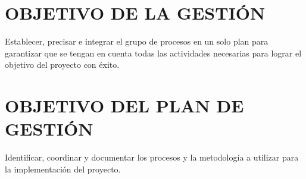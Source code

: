 \chapter{OBJETIVO DE LA GESTI\'ON}

Establecer, precisar e integrar el grupo de procesos en un solo plan para 
garantizar que se tengan en cuenta todas las actividades necesarias para lograr
el objetivo del proyecto con \'exito.

\chapter{OBJETIVO DEL PLAN DE GESTI\'ON}

Identificar, coordinar y documentar los procesos y la metodolog\'ia a utilizar 
para la implementaci\'on del proyecto.%